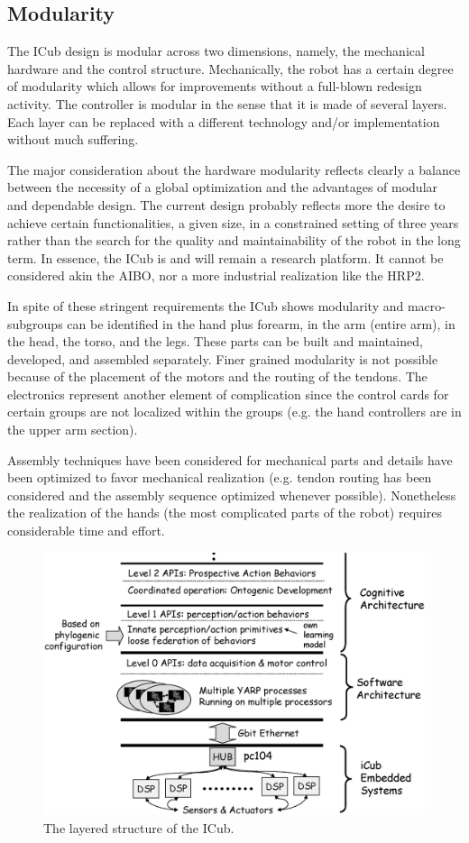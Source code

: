 \subsection{Modularity}
The ICub design is modular across two dimensions, namely, the mechanical hardware
and the control structure. Mechanically, the robot has a certain degree of modularity
which allows for improvements without a full-blown redesign activity. The controller
is modular in the sense that it is made of several layers. Each layer can be replaced
with a different technology and/or implementation without much suffering.

The major consideration about the hardware modularity reflects clearly a balance
between the necessity of a global optimization and the advantages of modular and 
dependable design. The current design probably reflects more the desire
to achieve certain functionalities, a given size, in a constrained setting of three 
years rather than the search for the quality and maintainability of the robot in
the long term. In essence, the ICub is and will remain a research platform. It cannot
be considered akin the AIBO, nor a more industrial realization like the HRP2.

In spite of these stringent requirements the ICub shows modularity and macro-subgroups
can be identified in the hand plus forearm, in the arm (entire arm), in the head, the torso,
and the legs. These parts can be built and maintained, developed, and assembled 
separately. Finer grained modularity is not possible because of the placement of the
motors and the routing of the tendons. The electronics represent another element of
complication since the control cards for certain groups are not localized within the 
groups (e.g. the hand controllers are in the upper arm section).

Assembly techniques have been considered for mechanical parts and details have been
optimized to favor mechanical realization (e.g. tendon routing has been considered and
the assembly sequence optimized whenever possible). Nonetheless the realization 
of the hands (the most complicated parts of the robot) requires considerable time 
and effort.

\begin{figure}[tbp]
\centerline{
\includegraphics[width=15cm]{layers}
}
\caption{The layered structure of the ICub. \label{fig:layers}}
\end{figure}

